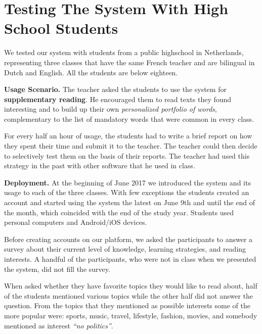 
\section{Testing The System With High School Students}
\label{sec:demographics}

We tested our system with \stcnt students from a public highschool in Netherlands, representing three classes that have the same French teacher and are bilingual in Dutch and English. All the students are below eighteen.

{\bf Usage Scenario. }
	The teacher asked the students to use the system for {\bf supplementary reading}. 
	He encouraged them to read texts they found interesting and to build up their own {\em personalized portfolio of words}, complementary to the list of mandatory words that were common in every class.
	
	For every half an hour of usage, the students had to write a brief report on how they spent their time and submit it to the teacher. The teacher could then decide to selectively test them on the basis of their reports. 
	The teacher had used this strategy in the past with other software that he used in class. 


{\bf Deployment.} At the beginning of June 2017 we introduced the system and its usage to each of the three classes. With few exceptions the students created an account and started using the system the latest on June 9th and until the end of the month, which coincided with the end of the study year. 
Students used personal computers and Android/iOS devices.

Before creating accounts on our platform, we asked the participants to answer a survey about their current level of knowledge, learning strategies, and reading interests. A handful of the participants, who were not in class when we presented the system, did not fill the survey.

When asked whether they have favorite topics they would like to read about, half of the students mentioned various topics while the other half did not answer the question. From the topics that they mentioned as possible interests some of the more popular were: sports, music, travel, lifestyle, fashion, movies, and somebody mentioned as interest {\em ``no politics''}.


